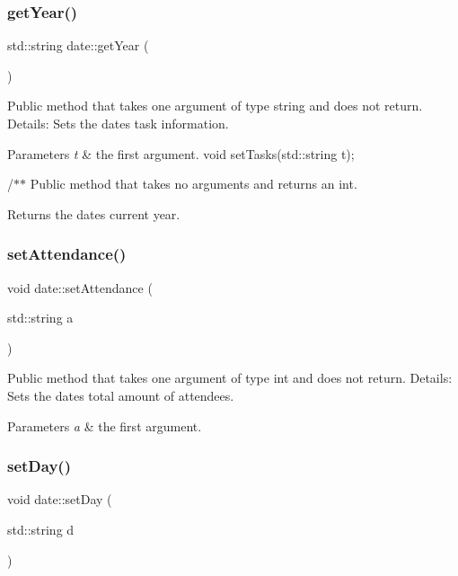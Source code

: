 \subsubsection{\texorpdfstring{get\+Year()}{getYear()}}
{\footnotesize\ttfamily std\+::string date\+::get\+Year (\begin{DoxyParamCaption}{ }\end{DoxyParamCaption})}

Public method that takes one argument of type string and does not return. Details\+: Sets the date\textquotesingle{}s task information. 
\begin{DoxyParams}{Parameters}
{\em t} & the first argument. void set\+Tasks(std\+::string t);\\
\hline
\end{DoxyParams}
/$\ast$$\ast$ Public method that takes no arguments and returns an int. \begin{DoxyReturn}{Returns}
the date\textquotesingle{}s current year. 
\end{DoxyReturn}
\mbox{\label{classdate_a2e519c8725e5421dab0378363f9a2ae1}} 
\subsubsection{\texorpdfstring{set\+Attendance()}{setAttendance()}}
{\footnotesize\ttfamily void date\+::set\+Attendance (\begin{DoxyParamCaption}\item[{std\+::string}]{a }\end{DoxyParamCaption})}

Public method that takes one argument of type int and does not return. Details\+: Sets the date\textquotesingle{}s total amount of attendees. 
\begin{DoxyParams}{Parameters}
{\em a} & the first argument. \\
\hline
\end{DoxyParams}
\mbox{\label{classdate_a28a572ab0502125e23a351dad18aa9af}} 
\subsubsection{\texorpdfstring{set\+Day()}{setDay()}}
{\footnotesize\ttfamily void date\+::set\+Day (\begin{DoxyParamCaption}\item[{std\+::string}]{d }\end{DoxyParamCaption})}

